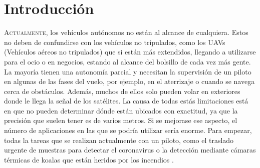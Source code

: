 \chapter{Introducción}\label{chp-02}



\lettrine[lraise=-0.1, lines=2, loversize=0.2]{A}{ctualmente}, los vehículos autónomos no están al alcance de cualquiera. Estos no deben de confundirse con los vehículos no tripulados, como los UAVs (Vehículos aéreos no tripulados) que si están más extendidos, llegando a utilizarse para el ocio o en negocios, estando al alcance del bolsillo de cada vez más gente. La mayoría tienen una autonomía parcial y necesitan la supervisión de un piloto en algunas de las fases del vuelo, por ejemplo, en el aterrizaje o cuando se navega cerca de obstáculos. Además, muchos de ellos solo pueden volar en exteriores donde le llega la señal de los satélites. 
La causa de todas estás limitaciones está en que no pueden determinar dónde están ubicados con exactitud, ya que la precisión que suelen tener es de varios metros. 
Si se mejorase ese aspecto, el número de aplicaciones en las que se podría utilizar sería enorme. Para empezar, todas la tareas que se realizan actualmente con un piloto, como el traslado urgente de muestras para detectar el coronavirus \cite{coronavirus} o la detección mediante cámaras térmicas de koalas que están heridos por los incendios \cite{koalas}. 
 

